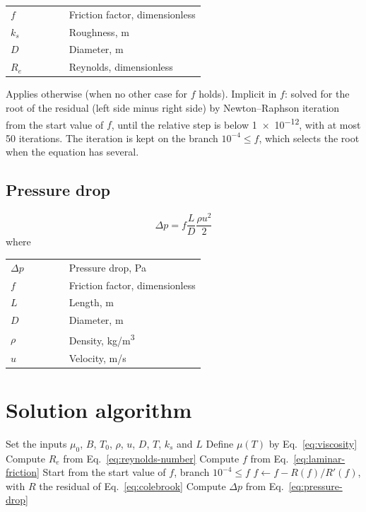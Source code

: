 \documentclass[11pt,a4paper]{article}
\begin{document}
\noindent\begin{tabular}{@{\quad}l@{\quad}p{0.7\linewidth}@{}}
  $f$ & Friction factor, dimensionless \\
  $k_s$ & Roughness, \si{m} \\
  $D$ & Diameter, \si{m} \\
  $R_e$ & Reynolds, dimensionless \\
\end{tabular}

\noindent Applies otherwise (when no other case for $f$ holds). Implicit in $f$: solved for the root of the residual (left side minus right side) by Newton–Raphson iteration from the start value of $f$, until the relative step is below \num{1e-12}, with at most 50 iterations. The iteration is kept on the branch $10^{-4} \le f$, which selects the root when the equation has several.

\subsection{Pressure drop}
\begin{equation}
  \Delta p = f \frac{L}{D} \frac{\rho u^2}{2}
  \label{eq:pressure-drop}
\end{equation}
\noindent where

\noindent\begin{tabular}{@{\quad}l@{\quad}p{0.7\linewidth}@{}}
  $\Delta p$ & Pressure drop, \si{Pa} \\
  $f$ & Friction factor, dimensionless \\
  $L$ & Length, \si{m} \\
  $D$ & Diameter, \si{m} \\
  $\rho$ & Density, \si{kg/m^{3}} \\
  $u$ & Velocity, \si{m/s} \\
\end{tabular}


\section{Solution algorithm}
\begin{algorithm}[htbp]
  \caption{Solution procedure}\label{alg:solution}
  \begin{algorithmic}[1]
    \State Set the inputs $\mu_0$, $B$, $T_0$, $\rho$, $u$, $D$, $T$, $k_s$ and $L$
    \State Define $\mu(T)$ by Eq.~\eqref{eq:viscosity}
    \State Compute $R_e$ from Eq.~\eqref{eq:reynolds-number}
      \State Compute $f$ from Eq.~\eqref{eq:laminar-friction}
    \Else
      \State Start from the start value of $f$, branch $10^{-4} \le f$
      \Repeat {}
        \State $f \leftarrow f - R(f) / R'(f)$, with $R$ the residual of Eq.~\eqref{eq:colebrook}
    \EndIf
    \State Compute $\Delta p$ from Eq.~\eqref{eq:pressure-drop}
  \end{algorithmic}
\end{algorithm}
\end{document}
